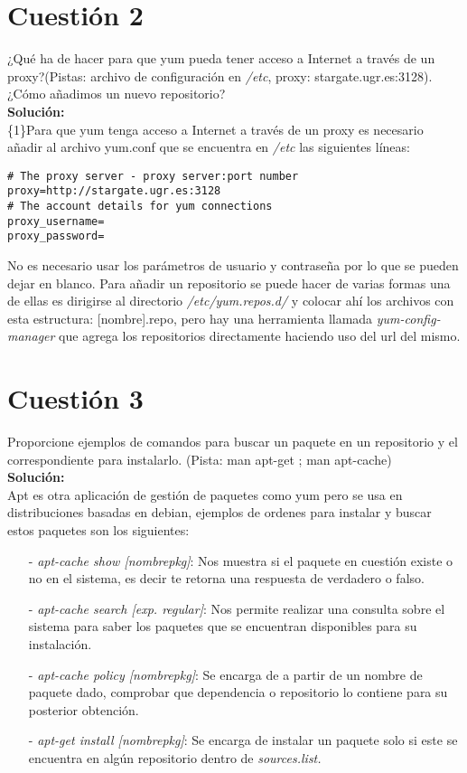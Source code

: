\documentclass[a4paper, 11pt]{article} %
\begin{document}
\section{Cuestión 2}
¿Qué ha de hacer para que yum pueda tener acceso a Internet a través de un proxy?(Pistas: archivo de configuración en \textit{/etc}, proxy: stargate.ugr.es:3128). ¿Cómo añadimos un nuevo repositorio?\\
\textbf{Solución:}\\
\{1\}Para que yum tenga acceso a Internet a través de un proxy es necesario añadir al archivo yum.conf que se encuentra en \textit{/etc} las siguientes líneas:
\begin{verbatim}
# The proxy server - proxy server:port number 
proxy=http://stargate.ugr.es:3128 
# The account details for yum connections 
proxy_username=
proxy_password=
\end{verbatim}
No es necesario usar los parámetros de usuario y contraseña por lo que se pueden dejar en blanco. Para añadir un repositorio se puede hacer de varias formas una de ellas es dirigirse al directorio \textit{/etc/yum.repos.d/} y colocar ahí los archivos con esta estructura: [nombre].repo, pero hay una herramienta llamada \textit{yum-config-manager} que agrega los repositorios directamente haciendo uso del url del mismo.
\section{Cuestión 3}
Proporcione ejemplos de comandos para buscar un paquete en un repositorio y el correspondiente para instalarlo. (Pista: man apt-get ; man apt-cache)\\
\textbf{Solución:}\\
Apt es otra aplicación de gestión de paquetes como yum pero se usa en distribuciones basadas en debian, ejemplos de ordenes para instalar y buscar estos paquetes son los siguientes:
\begin{itemize}
\item[-] \textit{apt-cache show [nombrepkg]}: Nos muestra si el paquete en cuestión existe o no en el sistema, es decir te retorna una respuesta de verdadero o falso.
\item[-] \textit{apt-cache search [exp. regular]}: Nos permite realizar una consulta sobre el sistema para saber los paquetes que se encuentran disponibles para su instalación.
\item[-] \textit{apt-cache policy [nombrepkg]}: Se encarga de a partir de un nombre de paquete dado, comprobar que dependencia o repositorio lo contiene para su posterior obtención.
\item[-] \textit{apt-get install [nombrepkg]}: Se encarga de instalar un paquete solo si este se encuentra en algún repositorio dentro de \textit{sources.list.}
\end{itemize}
\end{document}

